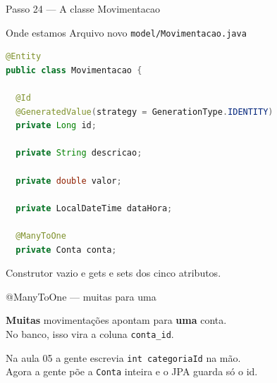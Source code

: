 \documentclass[aspectratio=169,11pt]{beamer}
\newcommand{\onde}[1]{%
  \begin{block}{Onde estamos}
    #1
  \end{block}
}
\begin{document}
\begin{frame}[fragile]{Passo 24 --- A classe Movimentacao}
  \onde{Arquivo novo \texttt{model/Movimentacao.java}}

\begin{lstlisting}[language=Java,basicstyle=\ttfamily\scriptsize]
@Entity
public class Movimentacao {

  @Id
  @GeneratedValue(strategy = GenerationType.IDENTITY)
  private Long id;

  private String descricao;

  private double valor;

  private LocalDateTime dataHora;

  @ManyToOne
  private Conta conta;
\end{lstlisting}

  Construtor vazio e gets e sets dos cinco atributos.
\end{frame}

\begin{frame}{@ManyToOne --- muitas para uma}
  \begin{center}
  \end{center}

  \vspace{0.4em}
  \textbf{Muitas} movimentações apontam para \textbf{uma} conta.\\
  No banco, isso vira a coluna \texttt{conta\_id}.

  \vspace{0.3em}
  Na aula 05 a gente escrevia \texttt{int categoriaId} na mão.\\
  Agora a gente põe a \texttt{Conta} inteira e o JPA guarda só o id.
\end{frame}
\end{document}
